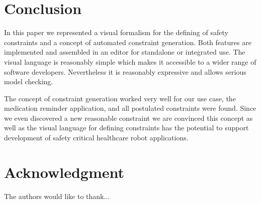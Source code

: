 \documentclass[conference]{IEEEtran}
\begin{document}
\section{Conclusion}

In this paper we represented a visual formalism for the defining of safety constraints and a concept of automated constraint generation. Both features are implemented and assembled in an editor for standalone or integrated use. The visual language is reasonably simple which makes it accessible to a wider range of software developers. Nevertheless it is reasonably expressive and allows serious model checking.

The concept of constraint generation worked very well for our use case, the medication reminder application, and all postulated constraints were found. Since we even discovered a new reasonable constraint we are convinced this concept as well as the visual language for defining constraints has the potential to support development of safety critical healthcare robot applications.






\section*{Acknowledgment}


The authors would like to thank...









%
\end{document}
